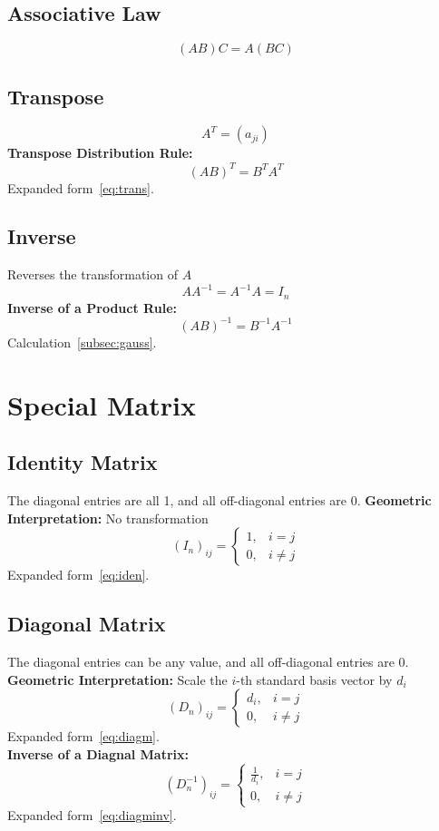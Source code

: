 \documentclass{article}
\begin{document}
\subsection{Associative Law}
\[
    (AB)C = A(BC)
\]

\subsection{Transpose}
\[
    A^T = (a_{ji})
\]
\textbf{Transpose Distribution Rule:}
\[
    (AB)^T = B^T A^T
\]
Expanded form~\ref{eq:trans}.

\subsection{Inverse}
Reverses the transformation of $A$
\[
    A A^{-1} = A^{-1} A = I_n
\]
\textbf{Inverse of a Product Rule:}
\[
    (AB)^{-1} = B^{-1}A^{-1}
\]
Calculation~\ref{subsec:gauss}.


\newpage
\section{Special Matrix}

\subsection{Identity Matrix}
The diagonal entries are all 1, and all off-diagonal entries are 0.
\newline
\textbf{Geometric Interpretation:} No transformation
\[
    (I_n)_{ij} =
    \begin{cases}
        1, & i = j \\
        0, & i \neq j
    \end{cases}
\]
Expanded form~\ref{eq:iden}.

\subsection{Diagonal Matrix}
The diagonal entries can be any value, and all off-diagonal entries are 0.
\newline
\textbf{Geometric Interpretation:} Scale the $i$-th standard basis vector by $d_i$
\[
    (D_n)_{ij} =
    \begin{cases}
        d_i, & i = j \\
        0, & i \neq j
    \end{cases}
\]
Expanded form~\ref{eq:diagm}.\\
\textbf{Inverse of a Diagnal Matrix:}
\[
    (D_n^{-1})_{ij} =
    \begin{cases}
        \frac{1}{d_i}, & i = j \\
        0, & i \neq j
    \end{cases}
\]
Expanded form~\ref{eq:diagminv}.
\end{document}
